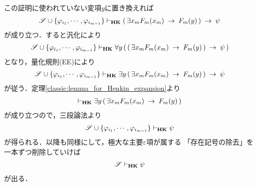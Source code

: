 \begin{sketch}
		この証明に使われていない変項$y$に置き換えれば
		\begin{align}
			\mathscr{S} \cup \{\varphi_{i_{1}},\cdots,\varphi_{i_{m-1}}\} 
			\vdash_{{\scriptsize \mbox{{\bf HK}}}} 
			(\, \exists x_{m} F_{m}(x_{m}) \hspace{0.25em}\rightarrow\hspace{0.25em} F_{m}(y)\, ) \hspace{0.25em}\rightarrow\hspace{0.25em} \psi
		\end{align}
		が成り立つ．すると汎化により
		\begin{align}
			\mathscr{S} \cup \{\varphi_{i_{1}},\cdots,\varphi_{i_{m-1}}\} 
			\vdash_{{\scriptsize \mbox{{\bf HK}}}} 
			\forall y\, (\, (\, \exists x_{m} F_{m}(x_{m}) \hspace{0.25em}\rightarrow\hspace{0.25em} F_{m}(y)\, ) \hspace{0.25em}\rightarrow\hspace{0.25em} \psi\, )
		\end{align}
		となり，量化規則(EE)により
		\begin{align}
			\mathscr{S} \cup \{\varphi_{i_{1}},\cdots,\varphi_{i_{m-1}}\} 
			\vdash_{{\scriptsize \mbox{{\bf HK}}}} 
			\exists y\, (\, \exists x_{m} F_{m}(x_{m}) \hspace{0.25em}\rightarrow\hspace{0.25em} F_{m}(y)\, ) \hspace{0.25em}\rightarrow\hspace{0.25em} \psi
		\end{align}
		が従う．定理\ref{classic:lemma_for_Henkin_expansion}より
		\begin{align}
			\vdash_{{\scriptsize \mbox{{\bf HK}}}} 
			\exists y\, (\, \exists x_{m} F_{m}(x_{m}) \hspace{0.25em}\rightarrow\hspace{0.25em} F_{m}(y)\, )
		\end{align}
		が成り立つので，三段論法より
		\begin{align}
			\mathscr{S} \cup \{\varphi_{i_{1}},\cdots,\varphi_{i_{m-1}}\} 
			\vdash_{{\scriptsize \mbox{{\bf HK}}}} \psi
		\end{align}
		が得られる．以降も同様にして，極大な主要$\varepsilon$項が属する
		「存在記号の除去」を一本ずつ削除していけば
		\begin{align}
			\mathscr{S} \vdash_{{\scriptsize \mbox{{\bf HK}}}} \psi
		\end{align}
		が出る．
		\QED
	\end{sketch}
	
